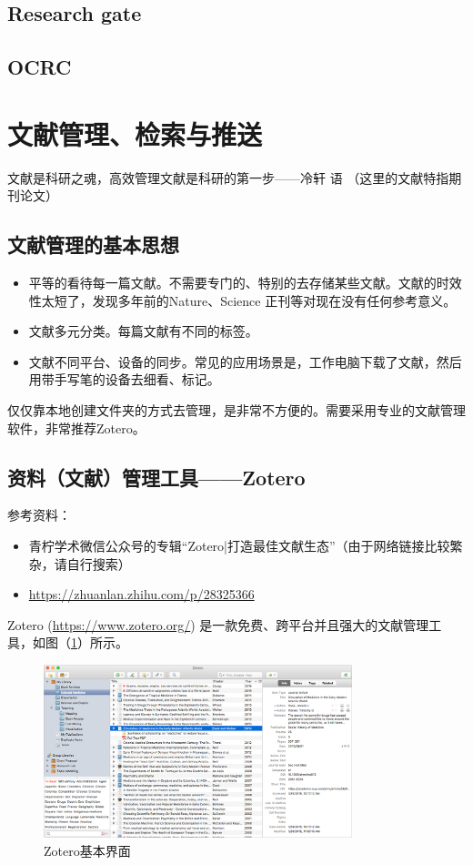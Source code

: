 \subsection{Research gate}


\subsection{OCRC}




\section{文献管理、检索与推送}
文献是科研之魂，高效管理文献是科研的第一步——冷轩 \quad 语 （这里的文献特指期刊论文）
\subsection{文献管理的基本思想}
\begin{itemize}
\item 平等的看待每一篇文献。不需要专门的、特别的去存储某些文献。文献的时效性太短了，发现多年前的Nature、Science 正刊等对现在没有任何参考意义。

\item 文献多元分类。每篇文献有不同的标签。

\item 文献不同平台、设备的同步。常见的应用场景是，工作电脑下载了文献，然后用带手写笔的设备去细看、标记。
\end{itemize}
仅仅靠本地创建文件夹的方式去管理，是非常不方便的。需要采用专业的文献管理软件，非常推荐Zotero。





\subsection{资料（文献）管理工具——Zotero}
参考资料：
\begin{itemize}
\item 青柠学术微信公众号的专辑“Zotero|打造最佳文献生态”（由于网络链接比较繁杂，请自行搜索）
\item \url{https://zhuanlan.zhihu.com/p/28325366}
\end{itemize}


Zotero (\url{https://www.zotero.org/}) 是一款免费、跨平台并且强大的文献管理工具，如图（\ref{fig566}）所示。
\begin{figure}[h!]
\centering
\includegraphics[width=0.8\textwidth]{pictures/zotero.png}
\caption{Zotero基本界面}
\label{fig566}
\end{figure}




